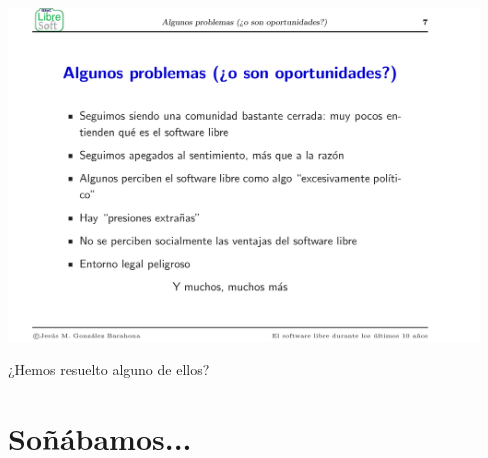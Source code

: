 \documentclass[17pt,aspectratio=169]{beamer}
\begin{document}
\begin{frame}

\begin{center}
  \includegraphics[width=12.5cm]{figs/transpas-08}
\end{center}  

\end{frame}

\begin{frame}

  \begin{center}
    {\Large
      ¿Hemos resuelto alguno de ellos?
    }
  \end{center}
  
\end{frame}

\section{Soñábamos...}
\end{document}
